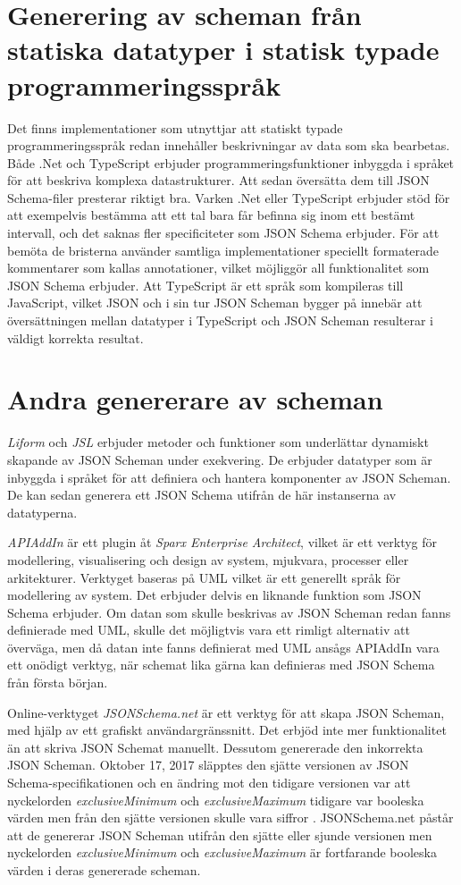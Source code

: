 \section{Generering av scheman från statiska datatyper i statisk typade programmeringsspråk}
Det finns implementationer som utnyttjar att statiskt typade programmeringsspråk redan innehåller beskrivningar av data som ska bearbetas. Både .Net och TypeScript erbjuder programmeringsfunktioner inbyggda i språket för att beskriva komplexa datastrukturer. Att sedan översätta dem till JSON Schema-filer presterar riktigt bra. Varken .Net eller TypeScript erbjuder stöd för att exempelvis bestämma att ett tal bara får befinna sig inom ett bestämt intervall, och det saknas fler specificiteter som JSON Schema erbjuder. För att bemöta de bristerna använder samtliga implementationer speciellt formaterade kommentarer som kallas annotationer, vilket möjliggör all funktionalitet som JSON Schema erbjuder. Att TypeScript är ett språk som kompileras till JavaScript, vilket JSON och i sin tur JSON Scheman bygger på innebär att översättningen mellan datatyper i TypeScript och JSON Scheman resulterar i väldigt korrekta resultat. \cite{Newtonsoft,Suter,El-Dardiry,Bovet}

\section{Andra genererare av scheman}
\textit{Liform} och \textit{JSL} erbjuder metoder och funktioner som underlättar dynamiskt skapande av JSON Scheman under exekvering. De erbjuder datatyper som är inbyggda i språket för att definiera och hantera komponenter av JSON Scheman. De kan sedan generera ett JSON Schema utifrån de här instanserna av datatyperna. \cite{Romanovich,Limenius}

\textit{APIAddIn} är ett plugin åt \textit{Sparx Enterprise Architect}, vilket är ett verktyg för modellering, visualisering och design av system, mjukvara, processer eller arkitekturer. Verktyget baseras på UML vilket är ett generellt språk för modellering av system. Det erbjuder delvis en liknande funktion som JSON Schema erbjuder. Om datan som skulle beskrivas av JSON Scheman redan fanns definierade med UML, skulle det möjligtvis vara ett rimligt alternativ att överväga, men då datan inte fanns definierat med UML ansågs APIAddIn vara ett onödigt verktyg, när schemat lika gärna kan definieras med JSON Schema från första början. \cite{Tomlinson}

Online-verktyget \textit{JSONSchema.net} är ett verktyg för att skapa JSON Scheman, med hjälp av ett grafiskt användargränssnitt. Det erbjöd inte mer funktionalitet än att skriva JSON Schemat manuellt. Dessutom genererade den inkorrekta JSON Scheman. Oktober 17, 2017 släpptes den sjätte versionen av JSON Schema-specifikationen och en ändring mot den tidigare versionen var att nyckelorden \textit{exclusiveMinimum} och \textit{exclusiveMaximum} tidigare var booleska värden men från den sjätte versionen skulle vara siffror \cite{Andrews}. JSONSchema.net påstår att de genererar JSON Scheman utifrån den sjätte eller sjunde versionen men nyckelorden \textit{exclusiveMinimum} och \textit{exclusiveMaximum} är fortfarande booleska värden i deras genererade scheman. \cite{Jackwootton}

